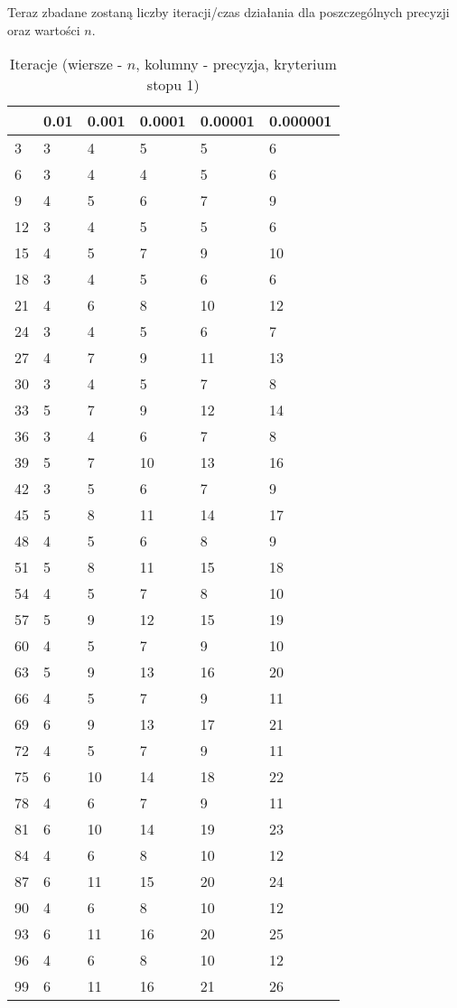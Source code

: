 \documentclass{article}
\begin{document}
Teraz zbadane zostaną liczby iteracji/czas działania dla poszczególnych precyzji oraz wartości $n$.

\begin{table}[H]
\centering
\begin{tabular}{|l|l|l|l|l|l|}
\hline
& 0.01 & 0.001 & 0.0001 & 0.00001 & 0.000001 \\ \hline
3 & 3 & 4 & 5 & 5 & 6 \\ \hline
6 & 3 & 4 & 4 & 5 & 6 \\ \hline
9 & 4 & 5 & 6 & 7 & 9 \\ \hline
12 & 3 & 4 & 5 & 5 & 6 \\ \hline
15 & 4 & 5 & 7 & 9 & 10 \\ \hline
18 & 3 & 4 & 5 & 6 & 6 \\ \hline
21 & 4 & 6 & 8 & 10 & 12 \\ \hline
24 & 3 & 4 & 5 & 6 & 7 \\ \hline
27 & 4 & 7 & 9 & 11 & 13 \\ \hline
30 & 3 & 4 & 5 & 7 & 8 \\ \hline
33 & 5 & 7 & 9 & 12 & 14 \\ \hline
36 & 3 & 4 & 6 & 7 & 8 \\ \hline
39 & 5 & 7 & 10 & 13 & 16 \\ \hline
42 & 3 & 5 & 6 & 7 & 9 \\ \hline
45 & 5 & 8 & 11 & 14 & 17 \\ \hline
48 & 4 & 5 & 6 & 8 & 9 \\ \hline
51 & 5 & 8 & 11 & 15 & 18 \\ \hline
54 & 4 & 5 & 7 & 8 & 10 \\ \hline
57 & 5 & 9 & 12 & 15 & 19 \\ \hline
60 & 4 & 5 & 7 & 9 & 10 \\ \hline
63 & 5 & 9 & 13 & 16 & 20 \\ \hline
66 & 4 & 5 & 7 & 9 & 11 \\ \hline
69 & 6 & 9 & 13 & 17 & 21 \\ \hline
72 & 4 & 5 & 7 & 9 & 11 \\ \hline
75 & 6 & 10 & 14 & 18 & 22 \\ \hline
78 & 4 & 6 & 7 & 9 & 11 \\ \hline
81 & 6 & 10 & 14 & 19 & 23 \\ \hline
84 & 4 & 6 & 8 & 10 & 12 \\ \hline
87 & 6 & 11 & 15 & 20 & 24 \\ \hline
90 & 4 & 6 & 8 & 10 & 12 \\ \hline
93 & 6 & 11 & 16 & 20 & 25 \\ \hline
96 & 4 & 6 & 8 & 10 & 12 \\ \hline
99 & 6 & 11 & 16 & 21 & 26 \\ \hline
\end{tabular}
\caption{Iteracje (wiersze - $n$, kolumny - precyzja, kryterium stopu 1)}
\end{table}
\end{document}
